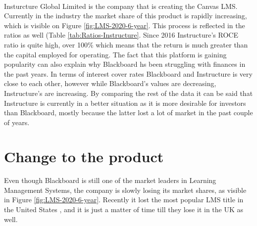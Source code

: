 \documentclass[]{article}
\begin{document}
\paragraph{}
Insturcture Global Limited is the company that is creating the Canvas LMS. Currently in the industry the market share of this product is rapidly increasing, which is visible on Figure \ref{fig:LMS-2020-6-year}. This process is reflected in the ratios as well (Table \ref{tab:Ratios-Instructure}. Since 2016 Instructure's ROCE ratio is quite high, over 100\% which means that the return is much greater than the capital employed for operating. The fact that this platform is gaining popularity can also explain why Blackboard hs been struggling with finances in the past years. In terms of interest cover rates Blackboard and Instructure is very close to each other, however while Blackboard's values are decreasing, Instructure's are increasing. By comparing the rest of the data it can be said that Instructure is currently in a better situation as it is more desirable for investors than Blackboard, mostly because the latter lost a lot of market in the past couple of years. 

\newpage

\section{Change to the product}

\paragraph{}
Even though Blackboard is still one of the market leaders in Learning Management Systems, the company is slowly losing its market shares, as visible in Figure \ref{fig:LMS-2020-6-year}. Recently it lost the most popular LMS title in the United States \cite{Canvas-overtakes-BB}, and it is just a matter of time till they lose it in the UK as well. 
\end{document}
